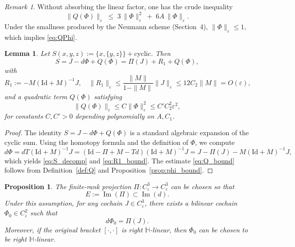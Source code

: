 \documentclass[10pt]{amsart}
\numberwithin{equation}{section}
\newtheorem{prop}[theorem]{Proposition}
\newtheorem{lem}[theorem]{Lemma}
\theoremstyle{remark}
\newtheorem{rmk}[theorem]{Remark}
\theoremstyle{definition}
\begin{document}
\begin{rmk}
Without absorbing the linear factor, one has the crude inequality
\[
\|Q(\Phi)\|_\varepsilon \;\le\; 3\,\|\Phi\|_\varepsilon^2 \;+\; 6A\,\|\Phi\|_\varepsilon.
\]
Under the smallness produced by the Neumann scheme (Section~4), $\|\Phi\|_\varepsilon\le 1$,
which implies \eqref{eq:QPhi}.
\end{rmk}

\begin{lem}\label{lem:S_decomp}
Let \(S(x, y, z) := \{x,\{y, z\}\} + \text{cyclic}\). Then
\begin{equation}\label{eq:S_decomp}
S = J - d\Phi + Q(\Phi) = \Pi(J) + R_1 + Q(\Phi),
\end{equation}
with
\begin{equation}\label{eq:R1_bound}
R_1 := -M(\mathrm{Id} + M)^{-1}J, \quad \|R_1\|_\varepsilon \leq \frac{\|M\|}{1 - \|M\|} \|J\|_\varepsilon \leq 12 C_2 \|M\| = O(\varepsilon),
\end{equation}
and a quadratic term \(Q(\Phi)\) satisfying
\begin{equation}\label{eq:Q_bound}
\|Q(\Phi)\|_\varepsilon \leq C \|\Phi\|_\varepsilon^2 \leq C' C_2^2 \varepsilon^2,
\end{equation}
for constants \(C, C' > 0\) depending polynomially on \(A, C_1\).
\end{lem}

\begin{proof}
The identity \(S = J - d\Phi + Q(\Phi)\) is a standard algebraic expansion of the cyclic sum. Using the homotopy formula and the definition of \(\Phi\), we compute
\[
d\Phi = dT(\mathrm{Id}+M)^{-1}J = (\mathrm{Id} - \Pi + M - Td)(\mathrm{Id}+M)^{-1}J = J - \Pi(J) - M(\mathrm{Id}+M)^{-1}J,
\]
which yields \eqref{eq:S_decomp} and \eqref{eq:R1_bound}. The estimate \eqref{eq:Q_bound} follows from Definition~\ref{def:Q} and Proposition~\ref{prop:phi_bound}.
\end{proof}

\begin{prop}\label{prop:finite_correction}
The finite-rank projection \(\Pi: C_\varepsilon^3 \to C_\varepsilon^3\) can be chosen so that
\[
E := \operatorname{Im}(\Pi) \subset \operatorname{Im}(d).
\]
Under this assumption, for any cochain \(J \in C_\varepsilon^3\), there exists a bilinear cochain \(\Phi_0 \in C_\varepsilon^2\) such that
\[
d\Phi_0 = \Pi(J).
\]
Moreover, if the original bracket \([\cdot,\cdot]\) is right \(\mathbb{H}\)-linear, then \(\Phi_0\) can be chosen to be right \(\mathbb{H}\)-linear.
\end{prop}
\end{document}
